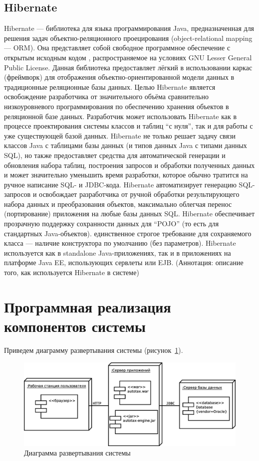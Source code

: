 \documentclass[14pt,a4paper]{reportmod}
\begin{document}
\subsection{Hibernate}
Hibernate — библиотека для языка программирования Java, предназначенная для решения задач объектно-реляционного проецирования (object-relational mapping — ORM). Она представляет собой свободное программное обеспечение с открытым исходным кодом , распространяемое на условиях GNU Lesser General Public License. Данная библиотека предоставляет лёгкий в использовании каркас (фреймворк) для отображения объектно-ориентированной модели данных в традиционные реляционные базы данных.
Целью Hibernate является освобождение разработчика от значительного объёма сравнительно низкоуровневого программирования по обеспечению хранения объектов в реляционной базе данных. Разработчик может использовать Hibernate как в процессе проектирования системы классов и таблиц ``с нуля'', так и для работы с уже существующей базой данных.
Hibernate не только решает задачу связи классов Java с таблицами базы данных (и типов данных Java с типами данных SQL), но также предоставляет средства для автоматической генерации и обновления набора таблиц, построения запросов и обработки полученных данных и может значительно уменьшить время разработки, которое обычно тратится на ручное написание SQL- и JDBC-кода. Hibernate автоматизирует генерацию SQL-запросов и освобождает разработчика от ручной обработки результирующего набора данных и преобразования объектов, максимально облегчая перенос (портирование) приложения на любые базы данных SQL.
Hibernate обеспечивает прозрачную поддержку сохранности данных  для ``POJO'' (то есть для стандартных Java-объектов). единственное строгое требование для сохраняемого класса — наличие конструктора по умолчанию (без параметров).
Hibernate используется как в standalone Java-приложениях, так и в приложениях на платформе Java EE, использующих сервлеты или EJB.
(Аннотация: описание того, как используется Hibernate в системе)

\section{Программная реализация компонентов системы}

Приведем диаграмму развертывания системы (рисунок~\ref{pic:deployment}).

\begin{figure}
  \centering
  \includegraphics[scale=0.4]{uml/deployment}
  \caption{Диаграмма развертывания системы}
  \label{pic:deployment}
\end{figure}
\end{document}
